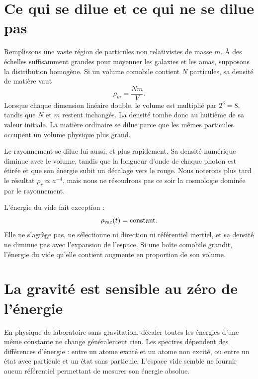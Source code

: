 \section{Ce qui se dilue et ce qui ne se dilue pas}

Remplissons une vaste région de particules non relativistes de masse \(m\). À des échelles suffisamment grandes pour moyenner les galaxies et les amas, supposons la distribution homogène. Si un volume comobile contient \(N\) particules, sa densité de matière vaut
\begin{equation}
\rho_m=\frac{Nm}{V}.
\end{equation}
Lorsque chaque dimension linéaire double, le volume est multiplié par \(2^3=8\), tandis que \(N\) et \(m\) restent inchangés. La densité tombe donc au huitième de sa valeur initiale. La matière ordinaire se dilue parce que les mêmes particules occupent un volume physique plus grand.

Le rayonnement se dilue lui aussi, et plus rapidement. Sa densité numérique diminue avec le volume, tandis que la longueur d’onde de chaque photon est étirée et que son énergie subit un décalage vers le rouge. Nous noterons plus tard le résultat \(\rho_r\propto a^{-4}\), mais nous ne résoudrons pas ce soir la cosmologie dominée par le rayonnement.

L’énergie du vide fait exception :
\begin{equation}
\rho_{\rm vac}(t)=\text{constant}.
\label{eq:l08-rho-vac-constant}
\end{equation}
Elle ne s’agrège pas, ne sélectionne ni direction ni référentiel inertiel, et sa densité ne diminue pas avec l’expansion de l’espace. Si une boîte comobile grandit, l’énergie du vide qu’elle contient augmente en proportion de son volume.


\section{La gravité est sensible au zéro de l’énergie}

En physique de laboratoire sans gravitation, décaler toutes les énergies d’une même constante ne change généralement rien. Les spectres dépendent des différences d’énergie : entre un atome excité et un atome non excité, ou entre un état avec particule et un état sans particule. L’espace vide semble ne fournir aucun référentiel permettant de mesurer son énergie absolue.

